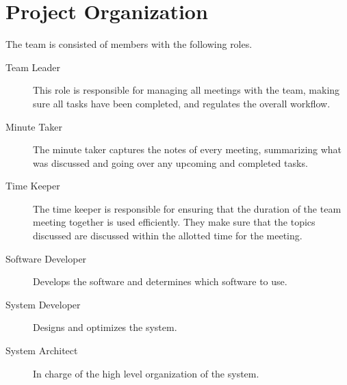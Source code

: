 \section{Project Organization}
The team is consisted of members with the following roles.
\begin{description}
    \item [Team Leader] This role is responsible for managing all meetings with the team, making sure all tasks have been completed, and regulates the overall workflow.
    \item [Minute Taker] The minute taker captures the notes of every meeting, summarizing what was discussed and going over any upcoming and completed tasks.
    \item [Time Keeper] The time keeper is responsible for ensuring that the duration of the team meeting together is used efficiently.
          They make sure that the topics discussed are discussed within the allotted time for the meeting.
    \item [Software Developer] Develops the software and determines which software to use.
    \item [System Developer] Designs and optimizes the system.
    \item [System Architect] In charge of the high level organization of the system.
\end{description}